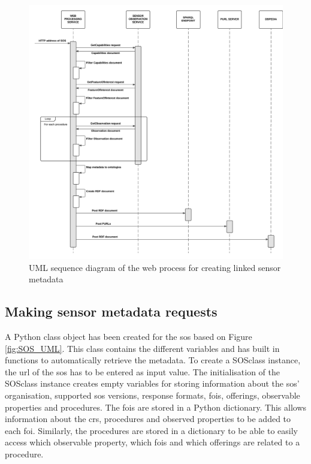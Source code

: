 \begin{figure}
	\centering
	\includegraphics[width=\linewidth]{UML/HarvestSOS.png}
	\caption{UML sequence diagram of the web process for creating linked sensor metadata}
	\label{fig:Sequence1}
\end{figure}

\subsection{Making sensor metadata requests}
A Python class object has been created for the \ac{sos} based on Figure \ref{fig:SOS_UML}. This class contains the different variables and has built in functions to automatically retrieve the metadata. To create a SOSclass instance, the \ac{url} of the \ac{sos} has to be entered as input value. The initialisation of the SOSclass instance creates empty variables for storing information about the \ac{sos}' organisation, supported \ac{sos} versions, response formats, \acp{foi}, offerings, observable properties and procedures. The \acp{foi} are stored in a Python dictionary. This allows information about the \ac{crs}, procedures and observed properties to be added to each \ac{foi}. Similarly, the procedures are stored in a dictionary to be able to easily access which observable property, which \acp{foi} and which offerings are related to a procedure.

